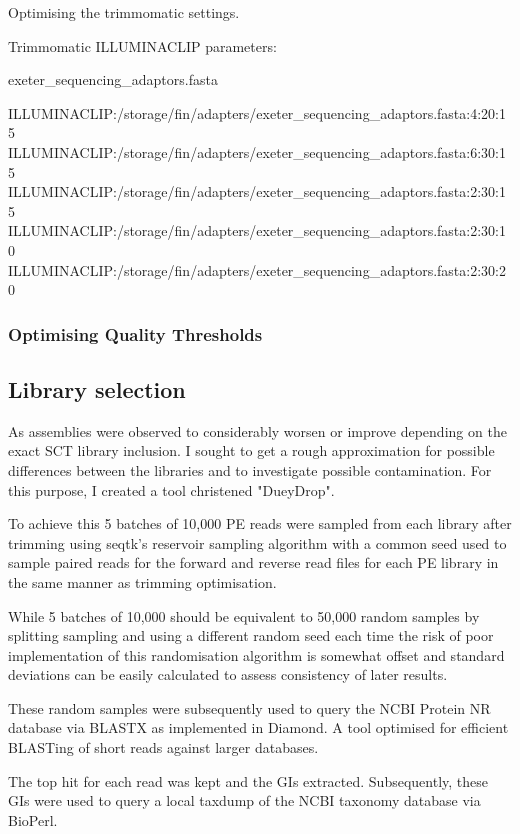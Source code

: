 Optimising the trimmomatic settings.



Trimmomatic ILLUMINACLIP parameters: 

exeter_sequencing_adaptors.fasta

ILLUMINACLIP:/storage/fin/adapters/exeter_sequencing_adaptors.fasta:4:20:15
ILLUMINACLIP:/storage/fin/adapters/exeter_sequencing_adaptors.fasta:6:30:15
ILLUMINACLIP:/storage/fin/adapters/exeter_sequencing_adaptors.fasta:2:30:15
ILLUMINACLIP:/storage/fin/adapters/exeter_sequencing_adaptors.fasta:2:30:10
ILLUMINACLIP:/storage/fin/adapters/exeter_sequencing_adaptors.fasta:2:30:20

\subsubsection{Optimising Quality Thresholds}


\subsection{Library selection}
As assemblies were observed to considerably worsen or improve depending on the exact 
SCT library inclusion.  I sought to get a rough approximation for possible differences between
the libraries and to investigate possible contamination.  For this purpose, I created a tool
christened "DueyDrop".

To achieve this 5 batches of 10,000 PE reads were sampled from each library after trimming %
using seqtk's \citep{SeqtkGitHub} reservoir sampling algorithm with a common seed used to sample paired
reads for the forward and reverse read files for each PE library in the same manner as trimming optimisation.

While 5 batches of 10,000 should be equivalent to 50,000 random samples by splitting sampling and using
a different random seed each time the risk of poor implementation of this randomisation algorithm is 
somewhat offset and standard deviations can be easily calculated to assess consistency of later results.

These random samples were subsequently used to query the NCBI Protein NR database via BLASTX as implemented
in Diamond.  A tool optimised for efficient BLASTing of short reads against larger databases.

The top hit for each read was kept and the GIs extracted.  Subsequently, these GIs were used to query
a local taxdump of the NCBI taxonomy database via BioPerl.

